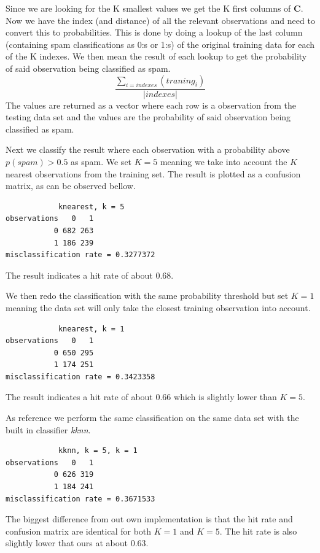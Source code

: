 \documentclass[a4paper,12pt]{article}
\begin{document}
Since we are looking for the K smallest values we get the K first columns of \(\mathbf{C}\). Now we have the index (and distance) of all the relevant observations and need to convert this to probabilities. This is done by doing a lookup of the last column (containing spam classifications as 0:s or 1:s) of the original training data for each of the K indexes. We then mean the result of each lookup to get the probability of said observation being classified as spam. 
\begin{equation}
  \frac{\sum_{i = indexes}({traning_i})}{\left | indexes \right |}
\end{equation} 
The values are returned as a vector where each row is a observation from the testing data set and the values are the probability of said observation being classified as spam.

Next we classify the result where each observation with a probability above \( p(spam) > 0.5\) as spam. We set \(K = 5\) meaning we take into account the \(K\) nearest observations from the training set. The result is plotted as a confusion matrix, as can be observed bellow. 
\begin{verbatim}
            knearest, k = 5
observations   0   1
           0 682 263
           1 186 239
misclassification rate = 0.3277372
\end{verbatim}
The result indicates a hit rate of about \(0.68\).

We then redo the classification with the same probability threshold but set \(K = 1\) meaning the data set will only take the closest training observation into account.
\begin{verbatim}
            knearest, k = 1
observations   0   1
           0 650 295
           1 174 251
misclassification rate = 0.3423358
\end{verbatim}
The result indicates a hit rate of about \(0.66\) which is slightly lower than \( K = 5\).

As reference we perform the same classification on the same data set with the built in classifier \textit{kknn}. 
\begin{verbatim}
            kknn, k = 5, k = 1
observations   0   1
           0 626 319
           1 184 241
misclassification rate = 0.3671533
\end{verbatim}
The biggest difference from out own implementation is that the hit rate and confusion matrix are identical for both \(K = 1\) and \(K = 5\). The hit rate is also slightly lower that ours at about \( 0.63\).
\end{document}
